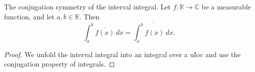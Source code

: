 \begin{theorem}
\label{intervalIntegral_conj}
\leanok
The conjugation symmetry of the interval integral. Let $f : \mathbb{R} \to \mathbb{C}$ be a
    measurable function, and let $a, b \in \mathbb{R}$. Then
    $$\int_{a}^{b} \overline{f(x)} \, dx = \overline{\int_{a}^{b} f(x) \, dx}.$$
\end{theorem}
\begin{proof}
\leanok
We unfold the interval integral into an integral over a uIoc and use the conjugation property
    of integrals.
\end{proof}
